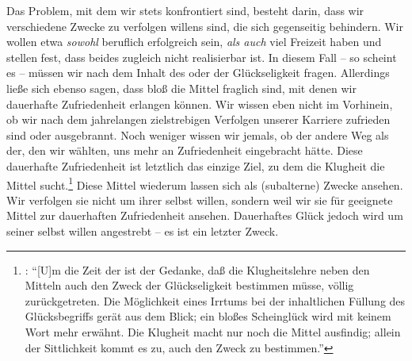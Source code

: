 Das Problem, mit dem wir stets konfrontiert sind, besteht darin, dass wir
verschiedene Zwecke zu verfolgen willens sind, die sich gegenseitig behindern. Wir wollen etwa
\emph{sowohl} beruflich erfolgreich sein, \emph{als auch} viel Freizeit haben
und stellen fest, dass beides zugleich nicht realisierbar ist. In diesem Fall --
so scheint es -- müssen wir nach dem Inhalt des  oder der
Glückseligkeit fragen. Allerdings ließe sich ebenso sagen, dass bloß die Mittel
fraglich sind, mit denen wir dauerhafte Zufriedenheit erlangen können. Wir
wissen eben nicht im Vorhinein, ob wir nach dem jahrelangen zielstrebigen
Verfolgen unserer Karriere zufrieden sind oder ausgebrannt. Noch weniger wissen
wir jemals, ob der andere Weg als der, den wir wählten, uns mehr an
Zufriedenheit eingebracht hätte. Diese dauerhafte Zufriedenheit ist letztlich
das einzige Ziel, zu dem die Klugheit die Mittel sucht.\footnote{\cite[Vgl.][185]{Schwaiger:KategorischeundandereImperative1999}: \enquote{[U]m
die Zeit der  ist der Gedanke, daß die Klugheitslehre neben den Mitteln auch
den Zweck der Glückseligkeit bestimmen müsse, völlig zurückgetreten. Die
Möglichkeit eines Irrtums bei der inhaltlichen Füllung des Glücksbegriffs gerät
aus dem Blick; ein bloßes Scheinglück wird mit keinem Wort mehr erwähnt. Die
Klugheit macht nur noch die Mittel ausfindig; allein der Sittlichkeit kommt es
zu, auch den Zweck zu bestimmen.}} Diese Mittel wiederum lassen sich als
(subalterne) Zwecke ansehen. Wir verfolgen sie nicht um ihrer selbst willen,
sondern weil wir sie für geeignete Mittel zur dauerhaften Zufriedenheit ansehen.
Dauerhaftes Glück jedoch wird um seiner selbst willen angestrebt -- es ist ein
letzter Zweck.



